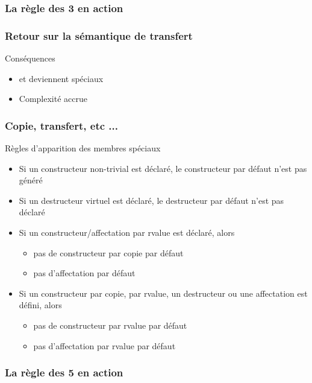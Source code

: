 \documentclass[svgnames]{beamer}
\begin{document}
\frame
{
  \frametitle{La règle des 3 en action}
}

\frame
{
  \frametitle{Retour sur la sémantique de transfert}
  \begin{center}\end{center}
  \begin{block}{Conséquences}
  \begin{itemize}
  \item {} et  deviennent spéciaux
  \item Complexité accrue
  \end{itemize}  
  \end{block}{}
}

\frame
{
  \frametitle{Copie, transfert, etc ...}
  \begin{block}{Règles d'apparition des membres spéciaux}
  \begin{itemize}
  \item  Si un constructeur non-trivial est déclaré, le constructeur par défaut n'est pas généré
   \item Si un destructeur virtuel est déclaré, le destructeur par défaut n'est pas déclaré
   \item Si un constructeur/affectation par rvalue est déclaré, alors
  \begin{itemize}
      \item pas de constructeur par copie par défaut
      \item pas d'affectation par défaut
  \end{itemize}
   \item  Si un constructeur par copie, par rvalue, un destructeur ou une
     affectation est défini, alors
  \begin{itemize}
    \item pas de constructeur par rvalue par défaut
    \item pas d'affectation par rvalue par défaut
  \end{itemize}
  \end{itemize}
  \end{block}
}

\frame
{
  \frametitle{La règle des 5 en action}
}
\end{document}
